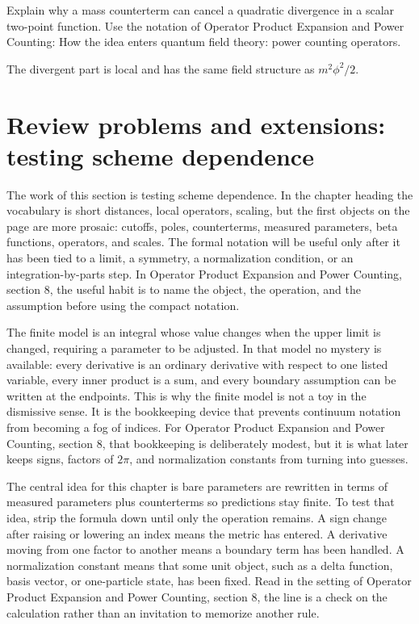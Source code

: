\begin{exercise}
Explain why a mass counterterm can cancel a quadratic divergence in a scalar two-point function.  Use the notation of Operator Product Expansion and Power Counting: How the idea enters quantum field theory: power counting operators.
\begin{answer}
The divergent part is local and has the same field structure as \(m^2\phi^2/2\).
\end{answer}
\end{exercise}



\section{Review problems and extensions: testing scheme dependence}

The work of this section is testing scheme dependence.  In the chapter heading the vocabulary is short distances, local operators, scaling, but the first objects on the page are more prosaic: cutoffs, poles, counterterms, measured parameters, beta functions, operators, and scales.  The formal notation will be useful only after it has been tied to a limit, a symmetry, a normalization condition, or an integration-by-parts step.  In Operator Product Expansion and Power Counting, section 8, the useful habit is to name the object, the operation, and the assumption before using the compact notation.

The finite model is an integral whose value changes when the upper limit is changed, requiring a parameter to be adjusted.  In that model no mystery is available: every derivative is an ordinary derivative with respect to one listed variable, every inner product is a sum, and every boundary assumption can be written at the endpoints.  This is why the finite model is not a toy in the dismissive sense.  It is the bookkeeping device that prevents continuum notation from becoming a fog of indices.  For Operator Product Expansion and Power Counting, section 8, that bookkeeping is deliberately modest, but it is what later keeps signs, factors of \(2\pi\), and normalization constants from turning into guesses.

The central idea for this chapter is bare parameters are rewritten in terms of measured parameters plus counterterms so predictions stay finite.  To test that idea, strip the formula down until only the operation remains.  A sign change after raising or lowering an index means the metric has entered.  A derivative moving from one factor to another means a boundary term has been handled.  A normalization constant means that some unit object, such as a delta function, basis vector, or one-particle state, has been fixed.  Read in the setting of Operator Product Expansion and Power Counting, section 8, the line is a check on the calculation rather than an invitation to memorize another rule.

